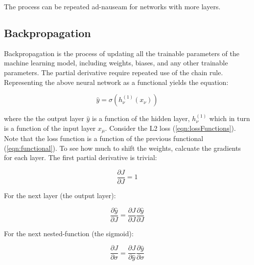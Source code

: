 \noindent The process can be repeated ad-nauseam for networks with more layers.

\subsection{Backpropagation}
Backpropagation is the process of updating all the trainable parameters of the machine learning model, including weights, biases, and any other trainable parameters. The partial derivative require repeated use of the chain rule. Representing the above neural network as a functional yields the equation:


\begin{equation}
    \label{eqn:functional}
    \hat{y} = \sigma \left( h_\nu ^{(1)} \left( x_\nu \right) \right)
\end{equation}

\noindent where the the output layer $ \hat{y} $ is a function of the hidden layer, $ h_\nu ^{(1)} $ which in turn is a function of the input layer $ x_\mu $. Consider the L2 loss (\ref{eqn:lossFunctions}). Note that the loss function is a function of the previous functional (\ref{eqn:functional}). To see how much to shift the weights, calcuate the gradients for each layer. The first partial derivative is trivial:

\begin{equation}
    \frac{\partial J}{\partial J} = 1
\end{equation}

\noindent For the next layer (the output layer):

\begin{equation}
\frac{\partial \hat{y}}{\partial J} = \frac{\partial J}{\partial J}\frac{\partial \hat{y}}{\partial J}
\end{equation}


\noindent For the next nested-function (the sigmoid):

\begin{equation}
\frac{\partial J}{\partial \sigma} = \frac{\partial J}{\partial \hat{y}} \frac{\partial \hat{y}}{\partial \sigma}
\end{equation}



